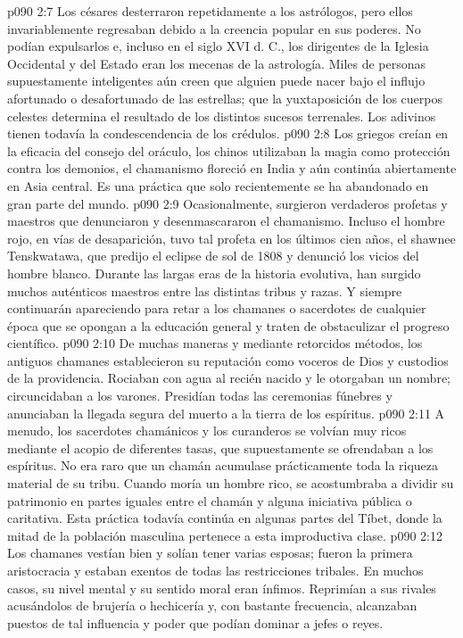 \vs p090 2:7 Los césares desterraron repetidamente a los astrólogos, pero ellos invariablemente regresaban debido a la creencia popular en sus poderes. No podían expulsarlos e, incluso en el siglo XVI d. C., los dirigentes de la Iglesia Occidental y del Estado eran los mecenas de la astrología. Miles de personas supuestamente inteligentes aún creen que alguien puede nacer bajo el influjo afortunado o desafortunado de las estrellas; que la yuxtaposición de los cuerpos celestes determina el resultado de los distintos sucesos terrenales. Los adivinos tienen todavía la condescendencia de los crédulos.
\vs p090 2:8 Los griegos creían en la eficacia del consejo del oráculo, los chinos utilizaban la magia como protección contra los demonios, el chamanismo floreció en India y aún continúa abiertamente en Asia central. Es una práctica que solo recientemente se ha abandonado en gran parte del mundo.
\vs p090 2:9 Ocasionalmente, surgieron verdaderos profetas y maestros que denunciaron y desenmascararon el chamanismo. Incluso el hombre rojo, en vías de desaparición, tuvo tal profeta en los últimos cien años, el shawnee Tenskwatawa, que predijo el eclipse de sol de 1808 y denunció los vicios del hombre blanco. Durante las largas eras de la historia evolutiva, han surgido muchos auténticos maestros entre las distintas tribus y razas. Y siempre continuarán apareciendo para retar a los chamanes o sacerdotes de cualquier época que se opongan a la educación general y traten de obstaculizar el progreso científico.
\vs p090 2:10 De muchas maneras y mediante retorcidos métodos, los antiguos chamanes establecieron su reputación como voceros de Dios y custodios de la providencia. Rociaban con agua al recién nacido y le otorgaban un nombre; circuncidaban a los varones. Presidían todas las ceremonias fúnebres y anunciaban la llegada segura del muerto a la tierra de los espíritus.
\vs p090 2:11 A menudo, los sacerdotes chamánicos y los curanderos se volvían muy ricos mediante el acopio de diferentes tasas, que supuestamente se ofrendaban a los espíritus. No era raro que un chamán acumulase prácticamente toda la riqueza material de su tribu. Cuando moría un hombre rico, se acostumbraba a dividir su patrimonio en partes iguales entre el chamán y alguna iniciativa pública o caritativa. Esta práctica todavía continúa en algunas partes del Tíbet, donde la mitad de la población masculina pertenece a esta improductiva clase.
\vs p090 2:12 Los chamanes vestían bien y solían tener varias esposas; fueron la primera aristocracia y estaban exentos de todas las restricciones tribales. En muchos casos, su nivel mental y su sentido moral eran ínfimos. Reprimían a sus rivales acusándolos de brujería o hechicería y, con bastante frecuencia, alcanzaban puestos de tal influencia y poder que podían dominar a jefes o reyes.
